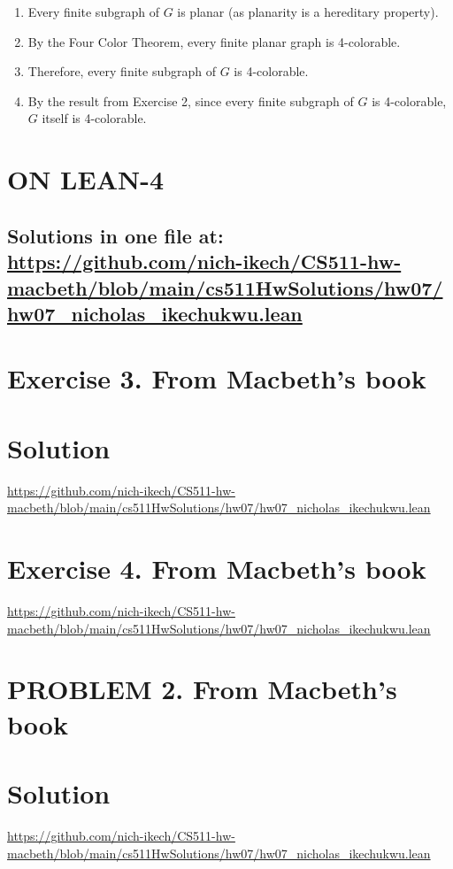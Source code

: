 \documentclass{article}
\newenvironment{proof}
{\begin{mdframed}[linewidth=0.5pt]\begin{enumerate}[label=\arabic*.,leftmargin=*]}
{\end{enumerate}\end{mdframed}}
\begin{document}
\begin{proof}
    
    \item Every finite subgraph of $G$ is planar (as planarity is a hereditary property).
    
    \item By the Four Color Theorem, every finite planar graph is 4-colorable.
    
    \item Therefore, every finite subgraph of $G$ is 4-colorable.
    
    \item By the result from Exercise 2, since every finite subgraph of $G$ is 4-colorable, $G$ itself is 4-colorable.
    
    
    \end{proof}

\newpage







\section*{ON LEAN-4}
\subsection*{Solutions in one file at: 
\url{https://github.com/nich-ikech/CS511-hw-macbeth/blob/main/cs511HwSolutions/hw07/hw07_nicholas_ikechukwu.lean}}

\newpage

\section*{Exercise 3. From Macbeth's book}
\section*{Solution}
\url{https://github.com/nich-ikech/CS511-hw-macbeth/blob/main/cs511HwSolutions/hw07/hw07_nicholas_ikechukwu.lean}

\newpage

\section*{Exercise 4. From Macbeth's book}

\url{https://github.com/nich-ikech/CS511-hw-macbeth/blob/main/cs511HwSolutions/hw07/hw07_nicholas_ikechukwu.lean}

\newpage

\section*{PROBLEM 2. From Macbeth's book}
\section*{Solution}

\url{https://github.com/nich-ikech/CS511-hw-macbeth/blob/main/cs511HwSolutions/hw07/hw07_nicholas_ikechukwu.lean}
\end{document}
